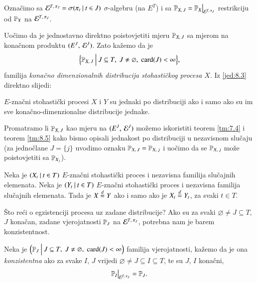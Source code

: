 \begin{defn}
    Ozna\v cimo sa $\mathcal{E}^{T, \: \pi_J} = \sigma({\pi_t} \: | \: {t \in J})$ $\sigma$-algebru (na $E^T$) i sa $\masP_{X, \: J} = \restr{\masP_X}{\famE^{T, \: \pi_J}}$ restrikciju od $\mathbb{P}_X$ na $\mathcal{E}^{T, \: \pi_J}$.
\end{defn}

Uo\v cimo da je jednostavno direktno poistovjetiti mjeru $\mathbb{P}_{X, \: J}$ sa mjerom na kona\v cnom produktu $({E^J}, \: {\mathcal{E}^J})$.
Zato ka\v zemo da je
\begin{equation}    \label{jed:8.4}
    \Big\{ {\mathbb{P}_{X, \: J}} \: \Big| \: {J \subseteq T, \; J \neq \varnothing, \; \textnormal{card}({J}) < \infty} \Big\},
\end{equation}
familija \emph{kona\v cno dimenzionalnih distribucija stohasti\v ckog procesa $X$}.
Iz \eqref{jed:8.3} direktno slijedi:

\begin{tm}  \label{tm:8.5}
    $E$-zna\v cni stohasti\v cki procesi $X$ i $Y$ su jednaki po distribuciji ako i samo ako su im sve kona\v cno-dimenzionalne distribucije jednake.
\end{tm}

Promatramo li $\mathbb{P}_{X, \: J}$ kao mjeru na $({E^J}, \: {\mathcal{E}^J})$ mo\v zemo iskoristiti teorem \ref{tm:7.4} i teorem \ref{tm:8.5} kako bismo opisali jednakost po distribuciji u nezavisnom slu\v caju (za jedno\v clane $J = \{j\}$ uvodimo oznaku $\mathbb{P}_{X, \: J} = \mathbb{P}_{X, \: j}$ i uo\v cimo da se $\mathbb{P}_{X, \: j}$ mo\v ze poistovjetiti sa $\mathbb{P}_{X_j}$).

\begin{kor} \label{kor:8.6}
    Neka je $({X_t} \: | \: {t \in T})$ $E$-zna\v cni stohasti\v cki proces i nezavisna familija slu\v cajnih elemenata.
    Neka je $({Y_t} \: | \: {t \in T})$ $E$-zna\v cni stohasti\v cki proces i nezavisna familija slu\v cajnih elemenata.
    Tada je $X \overset{d}{=} Y$ ako i samo ako je $X_t \overset{d}{=} Y_t$, za svaki $t \in T$.
\end{kor}

\v Sto re\' ci o egzistenciji procesa uz zadane distribucije?
Ako su za svaki $\varnothing \neq J \subseteq T$, $J$ kona\v can, zadane vjerojatnosti $\mathbb{P}_J$ na $\mathcal{E}^{T, \: \pi_J}$, potrebna nam je barem konzistentnost.

\begin{defn}    \label{defn:8.6-1}
    Neka je $\Big( {\mathbb{P}_J} \: \Big| \: {J \subseteq T, \; J \neq \varnothing, \; \textnormal{card}({J}) < \infty} \Big)$ familija vjerojatnosti, ka\v zemo da je ona \emph{konzistentna} ako za svake $I$, $J$ vrijedi $\varnothing \neq J \subseteq  I \subseteq T$, te su $J$, $I$ kona\v cni,
    \begin{equation}    \label{jed:8.7}
        \restr{\masP_I}{\famE^{T, \: \pi_J}} = \masP_J.
    \end{equation}
\end{defn}
 
